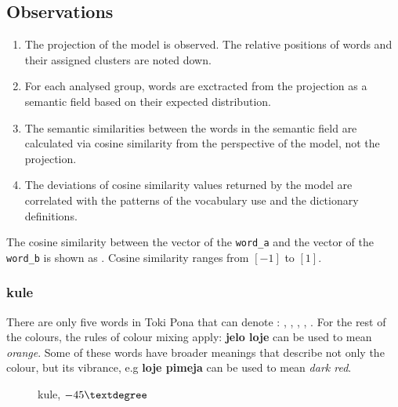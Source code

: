 \documentclass[14pt, a4paper]{extreport}
\makeatletter
\DeclareRobustCommand\ttfamily
        {\not@math@alphabet\ttfamily\mathtt
         \fontfamily\ttdefault\small\selectfont}
\makeatother
\begin{document}
    \subsection{Observations}
\begin{enumerate}
  \item The projection of the model is observed. The relative positions of words and their assigned clusters are noted down.
  \item For each analysed group, words are exctracted from the projection as a semantic field based on their expected distribution.
  \item The semantic similarities between the words in the semantic field are calculated via cosine similarity from the perspective of the model, not the projection.
  \item The deviations of cosine similarity values returned by the model are correlated with the patterns of the vocabulary use and the dictionary definitions.
\end{enumerate}

    The cosine similarity between the vector of the \texttt{word_a} and the vector of the \texttt{word_b} is shown as . Cosine similarity ranges from \([-1]\) to \([1]\).
      \subsubsection{kule}
There are only five words in Toki Pona that can denote : , , , , . For the rest of the colours, the rules of colour mixing apply: \textbf{jelo loje} can be used to mean \textit{orange}. Some of these words have broader meanings that describe not only the colour, but its vibrance, e.g \textbf{loje pimeja} can be used to mean \textit{dark red}.

\begin{figure}[ht]%
  \def\angle{-45}
  \bigskip
  \centering
  \caption{kule, \(\angle\textdegree\)}
\end{figure}%
\end{document}
